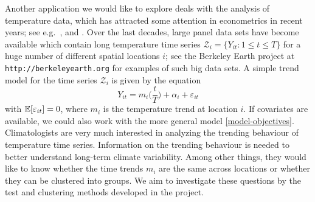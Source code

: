 \documentclass[a4paper,12pt]{article}
\begin{document}
Another application we would like to explore deals with the analysis of temperature data, which has attracted some attention in econometrics in recent years; see e.g.\ \cite{Gao2006}, \cite{Atak2011} and \cite{Davidson2016}. Over the last decades, large panel data sets have become available which contain long temperature time series $\mathcal{Z}_i = \{ Y_{it}: 1 \le t \le T \}$ for a huge number of different spatial locations $i$; see the Berkeley Earth project at \texttt{http://berkeleyearth.org} for examples of such big data sets. A simple trend model for the time series $\mathcal{Z}_i$ is given by the equation
\[ Y_{it} = m_i\Big(\frac{t}{T}\Big) + \alpha_i + \varepsilon_{it} \]
with $\mathbb{E}[\varepsilon_{it}] = 0$, where $m_i$ is the temperature trend at location $i$. %
If covariates are available, we could also work with the more general model \eqref{model-objectives}. Climatologists are very much interested in analyzing the trending behaviour of temperature time series. Information on the trending behaviour is needed to better understand long-term climate variability.  Among other things, they would like to know whether the time trends $m_i$ are the same across locations or whether they can be clustered into groups. We aim to investigate these questions by the test and clustering methods developed in the project. 
\end{document}
